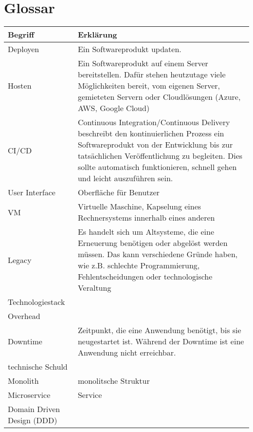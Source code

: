 \section{Glossar}
\begin{center}
	\begin{tabular}{lp{10cm}}
		Begriff & Erklärung \\ \hline
		Deployen & Ein Softwareprodukt updaten.  \\
		Hosten & Ein Softwareprodukt auf einem Server bereitstellen. Dafür stehen heutzutage viele Möglichkeiten bereit, vom eigenen Server, gemieteten Servern oder Cloudlösungen (Azure, AWS, Google Cloud) \\
		CI/CD & Continuous Integration/Continuous Delivery beschreibt den kontinuierlichen Prozess ein Softwareprodukt von der Entwicklung bis zur tatsächlichen Veröffentlichung zu begleiten. Dies sollte automatisch funktionieren, schnell gehen und leicht auszuführen sein.  \\
		User Interface  & Oberfläche für Benutzer  \\
		VM & Virtuelle Maschine, Kapselung eines Rechnersystems innerhalb eines anderen  \\
		Legacy & Es handelt sich um Altsysteme, die eine Erneuerung benötigen oder abgelöst werden müssen. Das kann verschiedene Gründe haben, wie z.B. schlechte Programmierung, Fehlentscheidungen oder technologische Veraltung   \\
		Technologiestack &   \\
		Overhead &   \\
		Downtime & Zeitpunkt, die eine Anwendung benötigt, bis sie neugestartet ist. Während der Downtime ist eine Anwendung nicht erreichbar.  \\
		technische Schuld &   \\
		Monolith & monolitsche Struktur \\
		Microservice & Service  \\	
		Domain Driven Design (DDD) &  \\	
	\end{tabular}
\end{center}